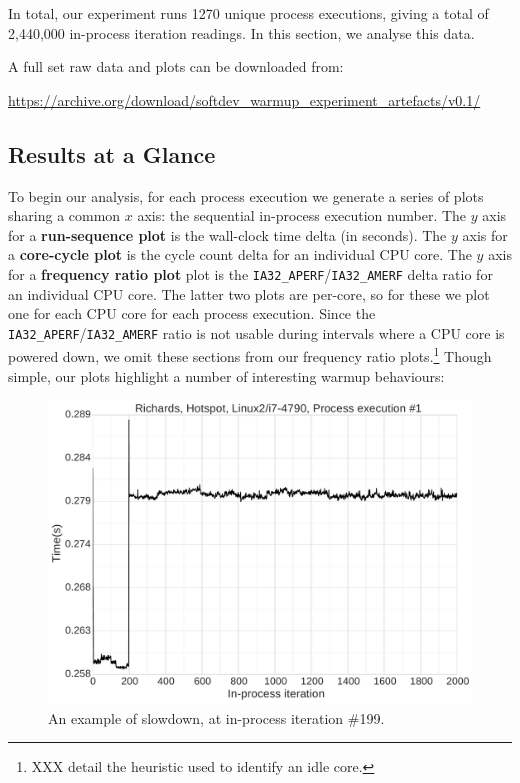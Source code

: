 \documentclass[preprint,numbers,10pt]{sigplanconf}
\begin{document}
In total, our experiment runs  1270 unique process executions, giving a total
of 2,440,000 in-process iteration readings.
In this section, we analyse this data.

A full set raw data and plots can be downloaded from:
\vspace{-.5em}
\begin{center}
{\small%
\url{https://archive.org/download/softdev_warmup_experiment_artefacts/v0.1/}
}
\end{center}

\subsection{Results at a Glance}

To begin our analysis, for each
process execution we generate a series of plots sharing a common $x$
axis: the sequential in-process execution number. The $y$ axis for a
\textbf{run-sequence plot} is the wall-clock time delta (in seconds). The $y$
axis for a \textbf{core-cycle plot} is the cycle count delta for an individual
CPU core. The $y$ axis for a \textbf{frequency ratio plot} plot is the
\texttt{IA32\_APERF}/\texttt{IA32\_AMERF} delta ratio for an individual CPU
core. The latter two plots are per-core, so for these we plot one for each CPU
core for each process execution. Since the
\texttt{IA32\_APERF}/\texttt{IA32\_AMERF} ratio is not usable during intervals
where a CPU core is powered down, we omit these sections from our frequency
ratio plots.\footnote{XXX detail the heuristic used to identify an idle core.}
Though simple, our plots highlight a number of interesting warmup behaviours:

\begin{figure}[tbp]
\includegraphics[width=.475\textwidth]{examples/slowdown1}
\caption{An example of slowdown, at in-process iteration \#199.}
\label{fig:examples:slowdown1}
\end{figure}
\end{document}
